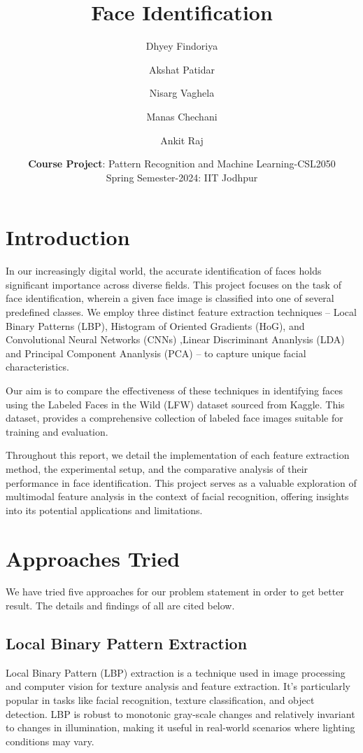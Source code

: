 \documentclass[a4paper]{article}
\title{\textbf{\Huge Face Identification}
\vspace{10mm}}
\author{\Large Dhyey Findoriya \and \Large Akshat Patidar\and \Large Nisarg Vaghela\and \Large  Manas Chechani\and \Large Ankit Raj}
\date{
\vspace{10mm}
	\textbf{Course Project}:   Pattern Recognition and Machine Learning-CSL2050\\ %
 \vspace{5mm} Spring Semester-2024: IIT Jodhpur%
}
\theoremstyle{plain}
\theoremstyle{definition}
\begin{document}
	\maketitle
	\vspace{25mm}
	

	\tableofcontents
 

\vspace{50mm}
	\section{\LARGE Introduction}
	\label{sec:intro}
	
    \Large
         In our increasingly digital world, the accurate identification of faces holds significant importance across diverse fields. This project focuses on the task of face identification, wherein a given face image is classified into one of several predefined classes. 
 \newline           We employ three distinct feature extraction techniques – Local Binary Patterns (LBP), Histogram of Oriented Gradients (HoG), and Convolutional Neural Networks (CNNs) ,Linear Discriminant Ananlysis (LDA) and Principal Component Ananlysis (PCA)
– to capture unique facial characteristics.

Our aim is to compare the effectiveness of these techniques in identifying faces using the Labeled Faces in the Wild (LFW) dataset sourced from Kaggle. This dataset, provides a comprehensive collection of labeled face images suitable for training and evaluation.

Throughout this report, we detail the implementation of each feature extraction method, the experimental setup, and the comparative analysis of their performance in face identification. This project serves as a valuable exploration of multimodal feature analysis in the context of facial recognition, offering insights into its potential applications and limitations.
	

	\newpage
	
	
	\section{Approaches Tried}
	\label{sec:app}
	We have tried five approaches for our problem statement in order to get better result. The details and findings of all are cited below.

        \subsection{Local Binary Pattern Extraction}
	Local Binary Pattern (LBP) extraction is a technique used in image processing and computer vision for texture analysis and feature extraction. It's particularly popular in tasks like facial recognition, texture classification, and object detection. LBP is robust to monotonic gray-scale changes and relatively invariant to changes in illumination, making it useful in real-world scenarios where lighting conditions may vary.\bigskip
\end{document}
